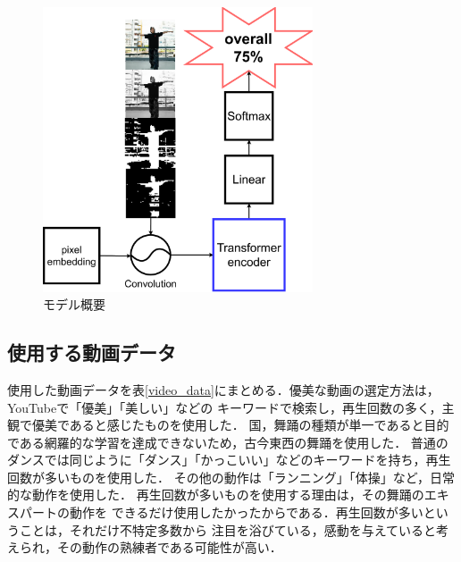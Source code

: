\begin{figure}[t]
  \begin{center}
    \includegraphics[width=80mm]{images/chart/easy_chart.pdf}
  \end{center}
  \caption{モデル概要}
  \label{easy_chart}
\end{figure}

\subsection{使用する動画データ}
使用した動画データを表\ref{video_data}にまとめる．優美な動画の選定方法は，YouTubeで「優美」「美しい」などの
キーワードで検索し，再生回数の多く，主観で優美であると感じたものを使用した．
国，舞踊の種類が単一であると目的である網羅的な学習を達成できないため，古今東西の舞踊を使用した．
普通のダンスでは同じように「ダンス」「かっこいい」などのキーワードを持ち，再生回数が多いものを使用した．
その他の動作は「ランニング」「体操」など，日常的な動作を使用した．
再生回数が多いものを使用する理由は，その舞踊のエキスパートの動作を
できるだけ使用したかったからである．再生回数が多いということは，それだけ不特定多数から
注目を浴びている，感動を与えていると考えられ，その動作の熟練者である可能性が高い．
\clearpage

